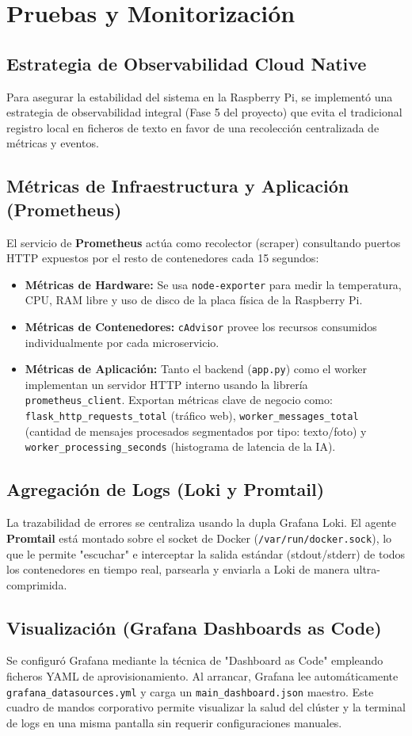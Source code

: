 \section{Pruebas y Monitorización}
\label{sec:monitorizacion}

\subsection{Estrategia de Observabilidad Cloud Native}
Para asegurar la estabilidad del sistema en la Raspberry Pi, se implementó una estrategia de observabilidad integral (Fase 5 del proyecto) que evita el tradicional registro local en ficheros de texto en favor de una recolección centralizada de métricas y eventos.

\subsection{Métricas de Infraestructura y Aplicación (Prometheus)}
El servicio de \textbf{Prometheus} actúa como recolector (scraper) consultando puertos HTTP expuestos por el resto de contenedores cada 15 segundos:
\begin{itemize}
    \item \textbf{Métricas de Hardware:} Se usa \texttt{node-exporter} para medir la temperatura, CPU, RAM libre y uso de disco de la placa física de la Raspberry Pi.
    \item \textbf{Métricas de Contenedores:} \texttt{cAdvisor} provee los recursos consumidos individualmente por cada microservicio.
    \item \textbf{Métricas de Aplicación:} Tanto el backend (\texttt{app.py}) como el worker implementan un servidor HTTP interno usando la librería \texttt{prometheus\_client}. Exportan métricas clave de negocio como: \texttt{flask\_http\_requests\_total} (tráfico web), \texttt{worker\_messages\_total} (cantidad de mensajes procesados segmentados por tipo: texto/foto) y \texttt{worker\_processing\_seconds} (histograma de latencia de la IA).
\end{itemize}

\subsection{Agregación de Logs (Loki y Promtail)}
La trazabilidad de errores se centraliza usando la dupla Grafana Loki. El agente \textbf{Promtail} está montado sobre el socket de Docker (\texttt{/var/run/docker.sock}), lo que le permite "escuchar" e interceptar la salida estándar (stdout/stderr) de todos los contenedores en tiempo real, parsearla y enviarla a Loki de manera ultra-comprimida.

\subsection{Visualización (Grafana Dashboards as Code)}
Se configuró Grafana mediante la técnica de "Dashboard as Code" empleando ficheros YAML de aprovisionamiento. Al arrancar, Grafana lee automáticamente \texttt{grafana\_datasources.yml} y carga un \texttt{main\_dashboard.json} maestro. Este cuadro de mandos corporativo permite visualizar la salud del clúster y la terminal de logs en una misma pantalla sin requerir configuraciones manuales.
